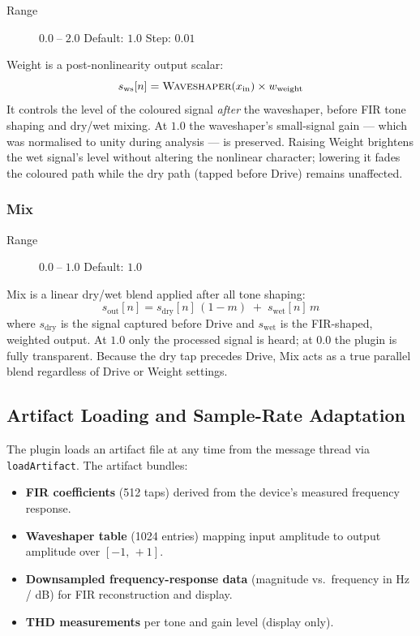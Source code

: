 \documentclass[11pt, letterpaper]{article}
\begin{document}
\begin{description}
  \item[Range] $0.0 \;\text{--}\; 2.0$ \quad Default: $1.0$ \quad Step: $0.01$
\end{description}

Weight is a post-nonlinearity output scalar:
\[
  s_{\text{ws}}[n] = \textsc{Waveshaper}(x_{\text{in}}) \times w_{\text{weight}}
\]
It controls the level of the coloured signal \emph{after} the waveshaper,
before FIR tone shaping and dry/wet mixing.  At $1.0$ the waveshaper's
small-signal gain — which was normalised to unity during analysis — is
preserved.  Raising Weight brightens the wet signal's level without
altering the nonlinear character; lowering it fades the coloured path
while the dry path (tapped before Drive) remains unaffected.

\subsubsection{Mix}

\begin{description}
  \item[Range] $0.0 \;\text{--}\; 1.0$ \quad Default: $1.0$
\end{description}

Mix is a linear dry/wet blend applied after all tone shaping:
\[
  s_{\text{out}}[n] = s_{\text{dry}}[n]\,(1 - m) \;+\; s_{\text{wet}}[n]\, m
\]
where $s_{\text{dry}}$ is the signal captured before Drive and
$s_{\text{wet}}$ is the FIR-shaped, weighted output.  At $1.0$ only the
processed signal is heard; at $0.0$ the plugin is fully transparent.
Because the dry tap precedes Drive, Mix acts as a true parallel blend
regardless of Drive or Weight settings.

\subsection{Artifact Loading and Sample-Rate Adaptation}
\label{sec:artifact_loading}

The plugin loads an artifact file at any time from the message thread via
\texttt{loadArtifact}.  The artifact bundles:
\begin{itemize}
  \item \textbf{FIR coefficients} (512 taps) derived from the device's
        measured frequency response.
  \item \textbf{Waveshaper table} (1024 entries) mapping input amplitude
        to output amplitude over $[-1,\,+1]$.
  \item \textbf{Downsampled frequency-response data} (magnitude vs.\
        frequency in Hz / dB) for FIR reconstruction and display.
  \item \textbf{THD measurements} per tone and gain level (display only).
\end{itemize}
\end{document}
